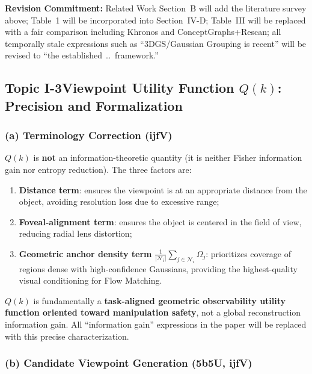 \documentclass[10pt,a4paper]{article}
\newcommand{\revs}[1]{\smallskip\noindent{\small\color{notegray}\textit{Addressed to: #1}}\smallskip}
\newcommand{\commitbox}[1]{\smallskip\noindent\textbf{Revision Commitment:} #1\smallskip}
\begin{document}
\commitbox{Related Work Section~B will add the literature survey above; Table~1 will be incorporated into Section~IV-D; Table~III will be replaced with a fair comparison including Khronos and ConceptGraphs+Rescan; all temporally stale expressions such as ``3DGS/Gaussian Grouping is recent'' will be revised to ``the established \ldots\ framework.''}

\subsection*{Topic I-3\enspace Viewpoint Utility Function $Q(k)$: Precision and Formalization}
\revs{5b5U (Q5), ijfV (M2)}

\subsubsection*{(a) Terminology Correction (ijfV)}

$Q(k)$ is \textbf{not} an information-theoretic quantity (it is neither Fisher information gain nor entropy reduction). The three factors are:
\begin{enumerate}[leftmargin=2em,topsep=2pt,itemsep=1pt]
  \item \textbf{Distance term}: ensures the viewpoint is at an appropriate distance from the object, avoiding resolution loss due to excessive range;
  \item \textbf{Foveal-alignment term}: ensures the object is centered in the field of view, reducing radial lens distortion;
  \item \textbf{Geometric anchor density term} $\frac{1}{|\mathcal{N}_i|}\sum_{j\in\mathcal{N}_i}\Omega_j$: prioritizes coverage of regions dense with high-confidence Gaussians, providing the highest-quality visual conditioning for Flow Matching.
\end{enumerate}
$Q(k)$ is fundamentally a \textbf{task-aligned geometric observability utility function oriented toward manipulation safety}, not a global reconstruction information gain. All ``information gain'' expressions in the paper will be replaced with this precise characterization.

\subsubsection*{(b) Candidate Viewpoint Generation (5b5U, ijfV)}
\end{document}
